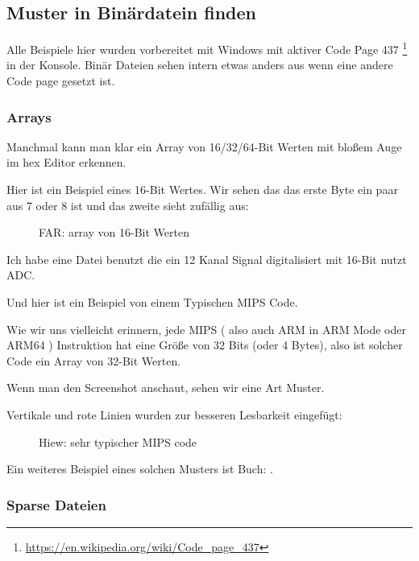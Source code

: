 
\subsection{ Muster in Bin\"ardatein finden}

Alle Beispiele hier wurden vorbereitet mit Windows mit aktiver Code Page 437
\footnote{\url{https://en.wikipedia.org/wiki/Code_page_437}} in der Konsole.
Bin\"ar Dateien sehen intern etwas anders aus wenn eine andere Code page gesetzt ist.

\clearpage
\subsubsection{Arrays}

Manchmal kann man klar ein Array von 16/32/64-Bit Werten mit bloßem Auge im hex Editor erkennen.

Hier ist ein Beispiel eines 16-Bit Wertes.
Wir sehen das das erste Byte ein paar aus 7 oder 8 ist und das zweite sieht
zuf\"allig aus:

\begin{figure}[H]
\centering
{}
\caption{FAR: array von 16-Bit Werten}
\end{figure}

Ich habe eine Datei benutzt die ein 12 Kanal Signal digitalisiert mit 16-Bit nutzt \ac{ADC}.

\clearpage
{}
\par Und hier ist ein Beispiel von einem Typischen MIPS Code.

Wie wir uns vielleicht erinnern, jede MIPS ( also auch ARM in ARM Mode oder ARM64 ) Instruktion hat eine Gr\"oße von 32 Bits (oder 4 Bytes),
also ist solcher Code ein Array von 32-Bit Werten. 

Wenn man den Screenshot anschaut, sehen wir eine Art Muster.

Vertikale und rote Linien wurden zur besseren Lesbarkeit eingef\"ugt:

\begin{figure}[H]
\centering
{}
\caption{Hiew: sehr typischer MIPS code}
\end{figure}

Ein weiteres Beispiel eines solchen Musters ist Buch:
.

\clearpage
\subsubsection{Sparse Dateien} 


